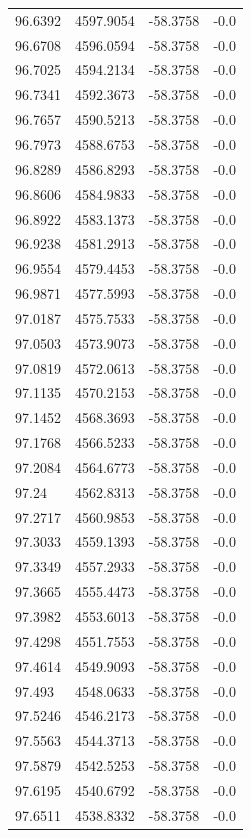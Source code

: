 \begin{table}[H]
\begin{tabular}{llll}
96.6392 & 4597.9054 & -58.3758 & -0.0 \\
96.6708 & 4596.0594 & -58.3758 & -0.0 \\
96.7025 & 4594.2134 & -58.3758 & -0.0 \\
96.7341 & 4592.3673 & -58.3758 & -0.0 \\
96.7657 & 4590.5213 & -58.3758 & -0.0 \\
96.7973 & 4588.6753 & -58.3758 & -0.0 \\
96.8289 & 4586.8293 & -58.3758 & -0.0 \\
96.8606 & 4584.9833 & -58.3758 & -0.0 \\
96.8922 & 4583.1373 & -58.3758 & -0.0 \\
96.9238 & 4581.2913 & -58.3758 & -0.0 \\
96.9554 & 4579.4453 & -58.3758 & -0.0 \\
96.9871 & 4577.5993 & -58.3758 & -0.0 \\
97.0187 & 4575.7533 & -58.3758 & -0.0 \\
97.0503 & 4573.9073 & -58.3758 & -0.0 \\
97.0819 & 4572.0613 & -58.3758 & -0.0 \\
97.1135 & 4570.2153 & -58.3758 & -0.0 \\
97.1452 & 4568.3693 & -58.3758 & -0.0 \\
97.1768 & 4566.5233 & -58.3758 & -0.0 \\
97.2084 & 4564.6773 & -58.3758 & -0.0 \\
97.24 & 4562.8313 & -58.3758 & -0.0 \\
97.2717 & 4560.9853 & -58.3758 & -0.0 \\
97.3033 & 4559.1393 & -58.3758 & -0.0 \\
97.3349 & 4557.2933 & -58.3758 & -0.0 \\
97.3665 & 4555.4473 & -58.3758 & -0.0 \\
97.3982 & 4553.6013 & -58.3758 & -0.0 \\
97.4298 & 4551.7553 & -58.3758 & -0.0 \\
97.4614 & 4549.9093 & -58.3758 & -0.0 \\
97.493 & 4548.0633 & -58.3758 & -0.0 \\
97.5246 & 4546.2173 & -58.3758 & -0.0 \\
97.5563 & 4544.3713 & -58.3758 & -0.0 \\
97.5879 & 4542.5253 & -58.3758 & -0.0 \\
97.6195 & 4540.6792 & -58.3758 & -0.0 \\
97.6511 & 4538.8332 & -58.3758 & -0.0 \\

\end{tabular}
\end{table}
